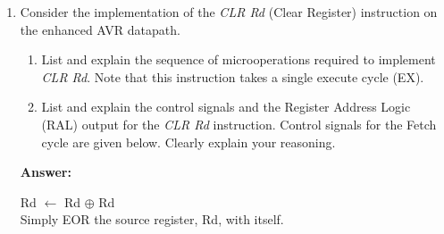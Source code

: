 \documentclass[12pt,letterpaper]{article}
\begin{document}
	\begin{enumerate}
	    \item
	    Consider the implementation of the \textit{CLR Rd} (Clear Register) instruction on the enhanced AVR datapath.
	    \begin{enumerate}[a]
	    	\item
	    	List and explain the sequence of microoperations required to implement \textit{CLR Rd}. Note that this
	    	instruction takes a single execute cycle (EX).
	    	
	    	\item
	    	List and explain the control signals and the Register Address Logic (RAL) output for the \textit{CLR Rd} instruction.
	    	Control signals for the Fetch cycle are given below. 
	    	Clearly explain your reasoning.
	    \end{enumerate}

		\textbf{Answer:}
		
		Rd $\leftarrow$ Rd $\oplus$ Rd
		\\
		Simply EOR the source register, Rd, with itself.
		

\end{enumerate}
\end{document}
